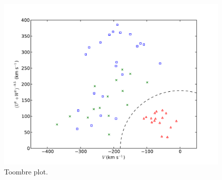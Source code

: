 \documentclass{emulateapj}
\begin{document}
\begin{figure}[h]
	\includegraphics[width=\columnwidth]{./figures/plot-toombre.pdf}
	\caption{Toombre plot.}
	\label{fig:toombre}
\end{figure}





\end{document}
